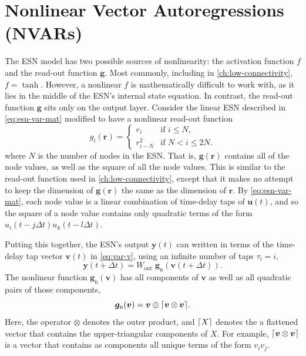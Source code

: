 \section{Nonlinear Vector Autoregressions (NVARs)}\label{sec:nvar}

The ESN model has two possible sources of nonlinearity: the
activation function $f$ and the read-out function $\bm{g}$. Most
commonly, including in \cref{ch:low-connectivity}, $f =
\tanh$. However, a nonlinear $f$ is mathematically difficult to work
with, as it lies in the middle of the ESN's internal state equation. In
contrast, the read-out function $\bm{g}$ sits only on the output
layer. Consider the linear ESN described in
\cref{eq:esn-var-mat} modified to have a nonlinear read-out function
\begin{equation}
  g_i(\bm{r}) = \begin{cases}
    r_i & \text{if } i \leq N, \\
    r_{i - N}^2 & \text{if } N < i \leq 2N.
  \end{cases}
  \label{eq:esn-quadratic-out}
\end{equation}
where $N$ is the number of nodes in the ESN.  That is,
$\bm{g}(\bm{r})$ contains all of the node values, as well as the
square of all the node values. This is similar to the read-out
function used in \cref{ch:low-connectivity}, except that it makes no
attempt to keep the dimension of $\bm{g}(\bm{r})$ the same as the dimension of $\bm{r}$. By
\cref{eq:esn-var-mat}, each node value is a linear combination of
time-delay taps of $\bm{u}(t)$, and so the square of a node value
contains only quadratic terms of the form $u_i(t-j\Delta
t)u_k(t-l\Delta t)$.

Putting this together, the ESN's output $\bm{y}(t)$ can written in
terms of the time-delay tap vector $\bm{v}(t)$ in \cref{eq:var-v},
using an infinite number of taps $\tau_i = i$,
\begin{equation}
  \bm{y}(t + \Delta t) = W_\text{out}\;\bm{g}_\text{n}\left(\bm{v}(t + \Delta t)\right).
\end{equation}
The nonlinear function $\bm{g}_\text{n}(\bm{v})$ has all
components of $\bm{v}$ as well as all quadratic pairs of those components,
\begin{equation}
  \label{eq:quadratic-nvar}
  \bm{g}_\text{n}(\bm{v}) = \bm{v} \oplus \lceil\bm{v} \otimes \bm{v}\rceil.
\end{equation}
Here, the operator $\otimes$ denotes the outer product, and $\lceil X\rceil$
denotes the a flattened vector that contains the upper-triangular
components of $X$. For example, $\lceil\bm{v} \otimes \bm{v}\rceil$ is a
vector that contains as components all unique terms of the form $v_i
v_j$.

